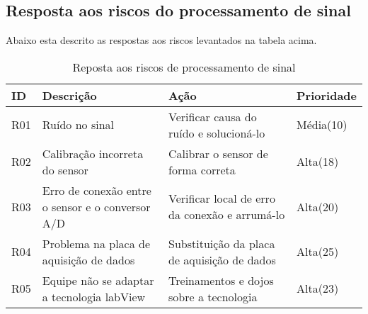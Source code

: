 \subsection{Resposta aos riscos do processamento de sinal}
Abaixo esta descrito as respostas aos riscos levantados na tabela acima.

\begin{table}[h]
    \centering
    \begin{tabular}{|p{1cm}|p{2cm}|p{2cm}|p{2cm}|}
        \hline
        \textbf{ID}  & \textbf{Descrição} & \textbf{Ação} & \textbf{Prioridade} \\ \hline
        R01 &Ruído no sinal &Verificar causa do ruído e solucioná-lo & Média(10) \\ \hline
        R02 &Calibração incorreta do sensor &Calibrar o sensor de forma correta &Alta(18) \\ \hline
        R03 &Erro de conexão entre o sensor e o conversor A/D &Verificar local de erro da conexão e arrumá-lo &Alta(20) \\ \hline
        R04 &Problema na placa de aquisição de dados &Substituição da placa de aquisição de dados &Alta(25) \\ \hline
        R05 &Equipe não se adaptar a tecnologia labView &Treinamentos e dojos sobre a tecnologia &Alta(23) \\ \hline
    \end{tabular}
\caption{Reposta aos riscos de processamento de sinal}
\end{table}